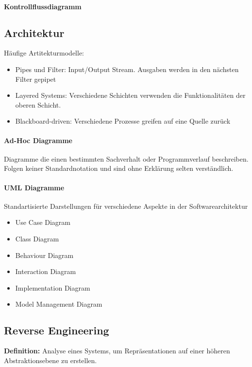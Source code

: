 \documentclass[ngerman]{scrartcl}
\begin{document}
\paragraph{Kontrollflussdiagramm} 


\subsection{Architektur}
Häufige Artitekturmodelle: 
\begin{itemize}
  \item Pipes und Filter: Input/Output Stream. Ausgaben werden in den nächsten Filter gepipet
  \item Layered Systems: Verschiedene Schichten verwenden die Funktionalitäten der oberen Schicht.
  \item Blackboard-driven: Verschiedene Prozesse greifen auf eine Quelle zurück
\end{itemize}

\paragraph{Ad-Hoc Diagramme} Diagramme die einen bestimmten Sachverhalt oder Programmverlauf beschreiben. Folgen keiner Standardnotation und sind ohne Erklärung selten verständlich.

\paragraph{UML Diagramme} Standartisierte Darstellungen für verschiedene Aspekte in der Softwarearchitektur

\begin{itemize}
  \item Use Case Diagram
  \item Class Diagram
  \item Behaviour Diagram
  \item Interaction Diagram
  \item Implementation Diagram
  \item Model Management Diagram
\end{itemize}

\subsection{Reverse Engineering}
\textbf{Definition:} Analyse eines Systems, um Repräsentationen auf einer höheren Abstraktionsebene zu erstellen.
\end{document}
